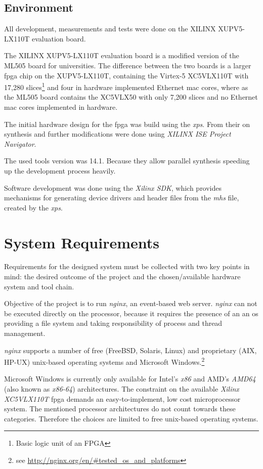 \section{Environment}

All development, measurements and tests were done on the XILINX XUPV5-LX110T evaluation board.

The XILINX XUPV5-LX110T evaluation board is a modified version of the ML505 board for universities\cite{xupv5manual}. The difference between the two boards is a larger \gls{fpga} chip on the XUPV5-LX110T, containing the Virtex-5 XC5VLX110T with 17,280 slices\footnote{Basic logic unit of an FPGA\cite{fpga_ni}} and four in hardware implemented Ethernet \gls{mac} cores, where as the ML505 board contains the XC5VLX50 with only 7,200 slices and no Ethernet \gls{mac} cores implemented in hardware.

The initial hardware design for the \gls{fpga} was build using the \textit{\gls{xps}}. From their on synthesis and further modifications were done using \textit{XILINX ISE Project Navigator}.

The used tools version was 14.1. Because they allow parallel synthesis speeding up the development process heavily.

Software development was done using the \textit{Xilinx SDK}, which provides mechanisms for generating device drivers and header files from the \textit{\gls{mhs}} file, created by the \textit{\gls{xps}}.

\chapter{System Requirements}

Requirements for the designed system must be collected with two key points in mind: the desired outcome of the project and the chosen/available hardware system and tool chain.

Objective of the project is to run \textit{nginx}, an event-based web server. \textit{nginx} can not be executed directly on the processor, because it requires the presence of an an \gls{os} providing a file system and taking responsibility of process and thread management. 

\textit{nginx} supports a number of free (FreeBSD, Solaris, Linux) and proprietary (AIX, HP-UX) unix-based operating systems and Microsoft Windows.\footnote{see \url{http://nginx.org/en/\#tested_os_and_platforms}}

Microsoft Windows is currently only available for Intel's \textit{x86} and AMD's \textit{AMD64} (also known as \textit{x86-64}) architectures. The constraint on the available \textit{Xilinx XC5VLX110T} \gls{fpga} demands an easy-to-implement, low cost microprocessor system. The mentioned processor architectures do not count towards these categories. Therefore the choices are limited to free unix-based operating systems.

